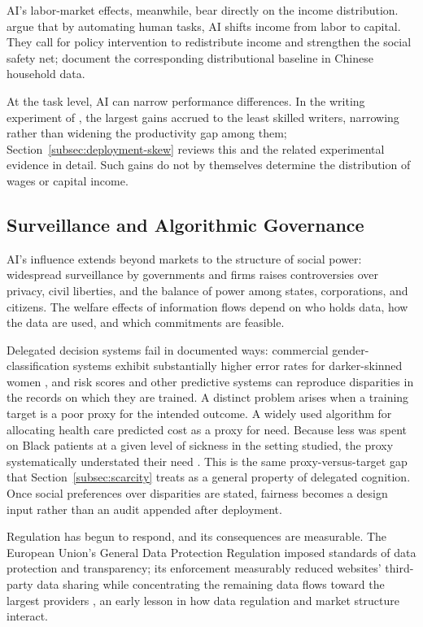 \documentclass[12pt]{article}
\theoremstyle{plain}
\theoremstyle{definition}
\theoremstyle{remark}
\begin{document}
AI's labor-market effects, meanwhile, bear directly on the income
distribution. \citet{KorinekStiglitz2017} argue that by automating
human tasks, AI shifts income from labor to capital. They call for policy
intervention to redistribute income and strengthen the social safety
net; \citet{LuoLiYue2021} document the corresponding distributional
baseline in Chinese household data.

At the task level, AI can narrow performance differences. In the writing experiment
of \citet{NoyZhang2023}, the largest gains accrued to the least skilled
writers, narrowing rather than widening the productivity gap among
them; Section~\ref{subsec:deployment-skew} reviews this and the related
experimental evidence in detail. Such gains do not by themselves
determine the distribution of wages or capital income.

\subsection{Surveillance and Algorithmic Governance}\label{subsec:governance}

AI's influence extends beyond markets to the structure of social
power: widespread surveillance by governments and firms raises
controversies over privacy, civil liberties, and the balance of power
among states, corporations, and citizens. The welfare effects of
information flows depend on who holds data, how the data are used, and
which commitments are feasible.

Delegated decision systems fail in documented ways: commercial gender-classification systems exhibit substantially higher
error rates for darker-skinned women
\citep{BuolamwiniGebru2018}, and risk scores and other predictive
systems can reproduce disparities in the records on which they are
trained. A distinct problem arises when a training target is a poor proxy for
the intended outcome. A widely used algorithm for allocating health
care predicted cost as a proxy for need. Because less was spent on
Black patients at a given level of sickness in the setting studied,
the proxy systematically understated their need \citep{Obermeyer2019}. This is the
same proxy-versus-target gap that Section~\ref{subsec:scarcity} treats as a
general property of delegated cognition. Once social preferences over
disparities are stated, fairness becomes a design input rather than an
audit appended after deployment.

Regulation has begun to respond, and its consequences are measurable.
The European Union's General Data Protection Regulation imposed
standards of data protection and transparency; its enforcement measurably
reduced websites' third-party data sharing while concentrating the
remaining data flows toward the largest providers
\citep{PeukertEtAl2022GDPR}, an early lesson in how data regulation and
market structure interact.
\end{document}
